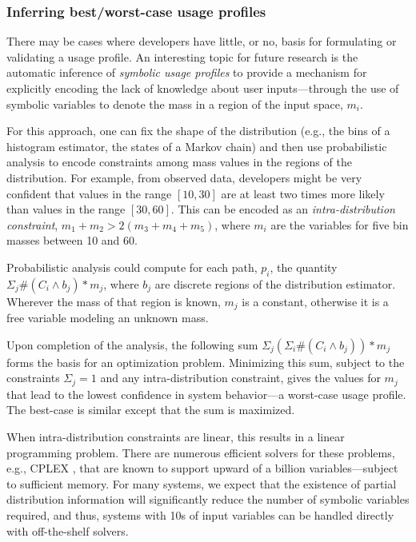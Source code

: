 \subsubsection{Inferring best/worst-case usage profiles}
There may be cases where developers have little, or no, basis for
formulating or validating a usage profile.  An interesting topic for
future research is the automatic inference of {\em symbolic usage
  profiles} to provide a mechanism for explicitly encoding the lack of
knowledge about user inputs---through the use of symbolic variables
to denote the mass in a region of the input space, $m_i$.

For this approach, one can fix the shape of the
distribution (e.g., the bins of a histogram estimator, the states of a
Markov chain) and then use probabilistic analysis to encode
constraints among mass values in the regions of the distribution.  
For example, from observed data, developers might be
very confident that values in the range $[10,30]$ are at least two
times more likely than values in the range $[30,60]$.  This can be
encoded as an \textit{intra-distribution constraint}, $m_1 + m_2 >
2(m_3 + m_4 + m_5)$, where $m_i$ are the variables for five bin masses
between 10 and 60.

Probabilistic analysis could compute for each path, $p_i$,
the quantity $\Sigma_{j} \#(C_i \wedge b_j)*m_j$, where $b_j$ are discrete
regions of the distribution estimator.  Wherever the mass
of that region is known, $m_j$ is a constant, otherwise it is
a free variable modeling an unknown mass.

Upon completion of the analysis, the following sum
$\Sigma_{j} (\Sigma_i \#(C_i \wedge b_j)) *m_j$
forms the basis for an optimization problem.
Minimizing this sum, subject to the constraints  
$\Sigma_j = 1$ and any intra-distribution constraint, gives
the values for $m_j$ that lead to the lowest confidence in
system behavior---a worst-case usage profile.  The best-case
is similar except that the sum is maximized.

When intra-distribution constraints are linear, this results
in a linear programming problem.  There are numerous efficient solvers
for these problems, e.g., CPLEX \cite{cplex2009v12}, that are known to
support upward of a billion variables---subject to sufficient memory.
For many systems, we expect that the existence of partial distribution
information
will significantly reduce the number of symbolic variables required,
and thus, systems with 10s of input variables can be handled
directly with off-the-shelf solvers. 

